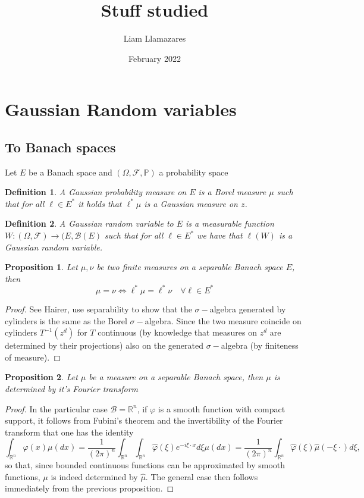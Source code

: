 \documentclass[12pt]{article}
\newcommand{\R}zzzzz
\newtheorem{proposition}{Proposition}
\newtheorem{definition}{Definition}
\begin{document}
\title{Stuff studied}
\author{Liam Llamazares}
\date{February 2022}
\maketitle
\section{Gaussian Random variables}
\subsection{To Banach spaces}
Let $E$ be a Banach space and $(\Omega,\mathcal{F},\mathbb{P})$ a probability space
\begin{definition}
	A \emph{Gaussian probability measure on $E$} is a Borel measure $\mu$ such that  for all \(\ell\in E^*\) it holds that \(\ell^*\mu\)  is a Gaussian measure on $\R$.
\end{definition}
\begin{definition}
	A Gaussian random variable to $E$ is a measurable function \(W:(\Omega,\mathcal{F})\to (E,\mathcal{B}(E)\) such that for all \(\ell\in E^*\) we have that \(\ell(W)\) is a Gaussian random variable.
\end{definition}
\begin{proposition}
	Let $\mu,\nu$ be two finite measures on a separable Banach space $E$, then
	\begin{equation*}
		\mu=\nu\iff \ell^*\mu=\ell^*\nu\quad\forall \ell\in E^*
	\end{equation*}
\end{proposition}
\begin{proof}
	See Hairer, use separability to show that the $\sigma-$algebra generated by cylinders is the same as the Borel $\sigma-$algebra. Since the two measure coincide on cylinders $T^{-1}(\R^d)$ for $T$ continuous (by knowledge that measures on $\R^d$ are determined by their projections) also on the generated $\sigma-$algebra (by finiteness of measure).
\end{proof}
\begin{proposition}
	Let $\mu$ be a measure on a separable Banach space, then $\mu$ is determined by it's Fourier transform
\end{proposition}
\begin{proof}
	In the particular case $\mathcal{B}=\mathbb{R}^{n}$, if $\varphi$ is a smooth function with compact support, it follows from Fubini's theorem and the invertibility of the Fourier transform that one has the identity
	$$
		\int_{\mathbb{R}^{n}} \varphi(x) \mu(d x)=\frac{1}{(2 \pi)^{n}} \int_{\mathbb{R}^{n}} \int_{\mathbb{R}^{n}} \hat{\varphi}(\xi) e^{-i \xi\cdot x} d \xi \mu(d x)=\frac{1}{(2 \pi)^{n}} \int_{\mathbb{R}^{n}} \hat{\varphi}(\xi) \hat{\mu}(-\xi\cdot) d \xi,
	$$
	so that, since bounded continuous functions can be approximated by smooth functions, $\mu$ is indeed determined by $\hat{\mu}$. The general case then follows immediately from the previous proposition.
\end{proof}
\end{document}
